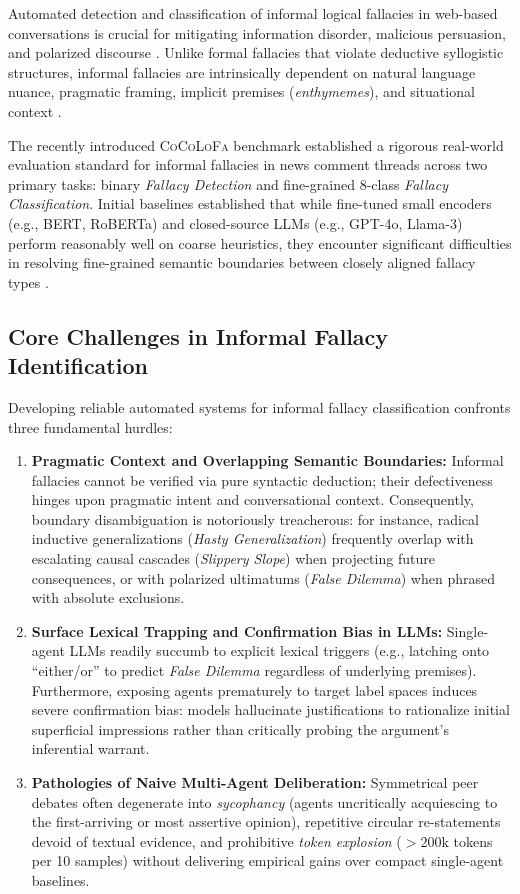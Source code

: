 \documentclass[11pt]{article}
\begin{document}
Automated detection and classification of informal logical fallacies in web-based conversations is crucial for mitigating information disorder, malicious persuasion, and polarized discourse \cite{jin2022logical,leihuang2024,schuetz2022}. Unlike formal fallacies that violate deductive syllogistic structures, informal fallacies are intrinsically dependent on natural language nuance, pragmatic framing, implicit premises (\textit{enthymemes}), and situational context \cite{walton1998,vaneemeren2004}. 

The recently introduced \textsc{CoCoLoFa} benchmark \cite{cocolofa2024} established a rigorous real-world evaluation standard for informal fallacies in news comment threads across two primary tasks: binary \textit{Fallacy Detection} and fine-grained 8-class \textit{Fallacy Classification}. Initial baselines established that while fine-tuned small encoders (e.g., BERT, RoBERTa) and closed-source LLMs (e.g., GPT-4o, Llama-3) perform reasonably well on coarse heuristics, they encounter significant difficulties in resolving fine-grained semantic boundaries between closely aligned fallacy types \cite{cocolofa2024}.

\subsection*{Core Challenges in Informal Fallacy Identification}
Developing reliable automated systems for informal fallacy classification confronts three fundamental hurdles:
\begin{enumerate}[leftmargin=*,itemsep=1.5pt,topsep=2pt]
    \item \textbf{Pragmatic Context and Overlapping Semantic Boundaries:} Informal fallacies cannot be verified via pure syntactic deduction; their defectiveness hinges upon pragmatic intent and conversational context. Consequently, boundary disambiguation is notoriously treacherous: for instance, radical inductive generalizations (\textit{Hasty Generalization}) frequently overlap with escalating causal cascades (\textit{Slippery Slope}) when projecting future consequences, or with polarized ultimatums (\textit{False Dilemma}) when phrased with absolute exclusions.
    \item \textbf{Surface Lexical Trapping and Confirmation Bias in LLMs:} Single-agent LLMs readily succumb to explicit lexical triggers (e.g., latching onto ``either/or'' to predict \textit{False Dilemma} regardless of underlying premises). Furthermore, exposing agents prematurely to target label spaces induces severe confirmation bias: models hallucinate justifications to rationalize initial superficial impressions rather than critically probing the argument's inferential warrant.
    \item \textbf{Pathologies of Naive Multi-Agent Deliberation:} Symmetrical peer debates often degenerate into \textit{sycophancy} (agents uncritically acquiescing to the first-arriving or most assertive opinion), repetitive circular re-statements devoid of textual evidence, and prohibitive \textit{token explosion} ($>200\text{k}$ tokens per 10 samples) without delivering empirical gains over compact single-agent baselines.
\end{enumerate}
\end{document}
